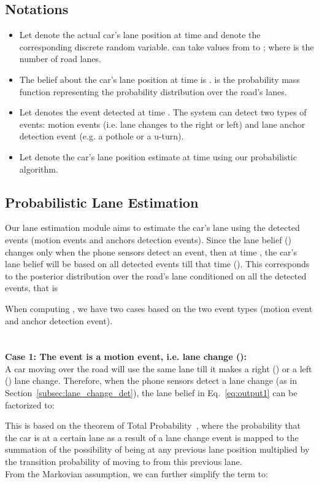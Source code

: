 \documentclass[10pt, conference, compsocconf]{IEEEtran}
\begin{document}
\subsection{Notations}
\begin{itemize}
\item Let  denote the actual car's lane position at time  and  denote the corresponding discrete random variable.  can take values from  to ; where  is the number of road lanes.
\item The belief about the car's lane position at time  is .  is the probability mass function representing the probability distribution over the road's lanes. \item Let  denotes the event detected at time . The system can detect two types of events: motion events  (i.e. lane changes to the right or left) and lane anchor detection event  (e.g. a pothole or a u-turn).
\item Let  denote the car's lane position estimate at time  using our probabilistic algorithm.

\end{itemize}
\subsection{Probabilistic Lane Estimation}\label{sec:prob_est}
Our lane estimation module aims to estimate the car's lane using the detected events (motion events and anchors detection events). Since the lane belief () changes only when the phone sensors detect an event, then at time , the car's lane belief will be based on all detected events till that time ().  This corresponds to the posterior distribution over the road's lane conditioned on all the detected events, that is
\vspace*{-10pt}

When computing  , we have two cases based on the two event types (motion event and anchor detection event).
\\
\\
\\
\textbf{Case 1: The event is a motion event, i.e. lane change ():}
\\
A car moving over the road will use the same lane till it makes a right () or a left () lane change.
 Therefore, when the phone sensors detect a lane change (as in Section~\ref{subsec:lane_change_det}), the lane belief in
Eq.~\ref{eq:output1} can be factorized to:

This is based on the theorem of Total Probability~\cite{ang2004probability}, where the probability that the car is at a certain lane  as a result of a lane change event is mapped to the summation of the possibility of being at any previous lane position multiplied by the transition probability of moving to  from this previous lane.
\\
From the Markovian assumption, we can further simplify the term  to:
\end{document}
